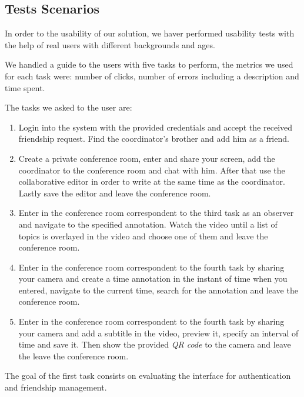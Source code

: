     \subsection{Tests Scenarios}

      In order to the usability of our solution, we haver performed usability tests with the help of real users with different backgrounds and ages.

      We handled a guide to the users with five tasks to perform, the metrics we used for each task were: number of clicks, number of errors including a description and time spent. 

      The tasks we asked to the user are:

      \begin{enumerate}
      \item Login into the system with the provided credentials and accept the received friendship request. Find the coordinator's brother and add him as a friend.

      \item Create a private conference room, enter and share your screen, add the coordinator to the conference room and chat with him. After that use the collaborative editor in order to write at the same time as the coordinator. Lastly save the editor and leave the conference room.

      \item Enter in the conference room correspondent to the third task as an observer and navigate to the specified annotation. Watch the video until a list of topics is overlayed in the video and choose one of them and leave the conference room.

      \item Enter in the conference room correspondent to the fourth task by sharing your camera and create a time annotation in the instant of time when you entered, navigate to the current time, search for the annotation and leave the conference room.

      \item Enter in the conference room correspondent to the fourth task by sharing your camera and add a subtitle in the video, preview it, specify an interval of time and save it. Then show the provided \emph{QR code} to the camera and leave the leave the conference room.
      \end{enumerate}

      The goal of the first task consists on evaluating the interface for authentication and friendship management.

